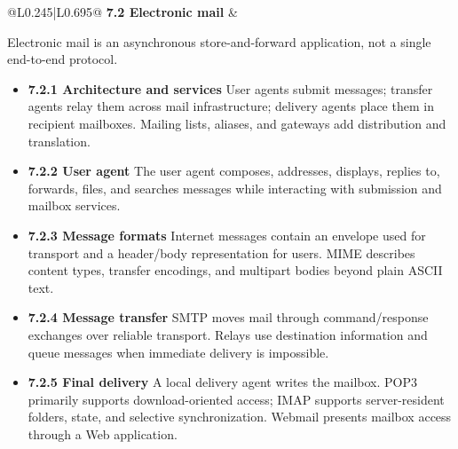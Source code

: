 \documentclass[10pt,letterpaper]{article}
\begin{document}
\begin{longtable}{@{}L{0.245\textwidth}|L{0.695\textwidth}@{}}
\textbf{7.2 Electronic mail} & \begin{minipage}[t]{\linewidth}\raggedright Electronic mail is an asynchronous store-and-forward application, not a single end-to-end protocol.\par\begin{itemize}\item \textbf{7.2.1 Architecture and services} User agents submit messages; transfer agents relay them across mail infrastructure; delivery agents place them in recipient mailboxes. Mailing lists, aliases, and gateways add distribution and translation.\item \textbf{7.2.2 User agent} The user agent composes, addresses, displays, replies to, forwards, files, and searches messages while interacting with submission and mailbox services.\item \textbf{7.2.3 Message formats} Internet messages contain an envelope used for transport and a header/body representation for users. MIME describes content types, transfer encodings, and multipart bodies beyond plain ASCII text.\item \textbf{7.2.4 Message transfer} SMTP moves mail through command/response exchanges over reliable transport. Relays use destination information and queue messages when immediate delivery is impossible.\item \textbf{7.2.5 Final delivery} A local delivery agent writes the mailbox. POP3 primarily supports download-oriented access; IMAP supports server-resident folders, state, and selective synchronization. Webmail presents mailbox access through a Web application.\end{itemize}\end{minipage} \\ \hline

\end{longtable}
\end{document}
